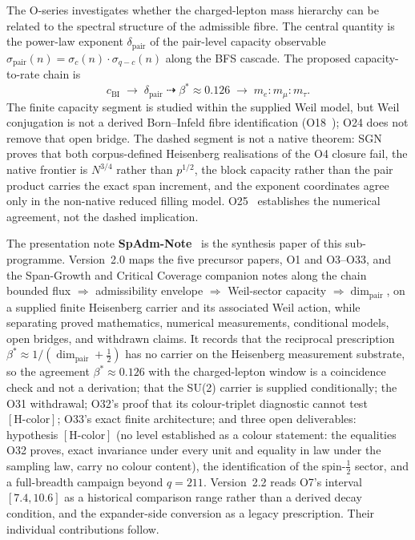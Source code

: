 \documentclass[11pt,a4paper]{article}
\begin{document}
  The O-series investigates whether the charged-lepton mass hierarchy can be related to the
  spectral structure of the admissible fibre.
  The central quantity is the power-law exponent $\delta_{\mathrm{pair}}$ of the pair-level
  capacity observable $\sigma_{\mathrm{pair}}(n) = \sigma_c(n)\cdot\sigma_{q-c}(n)$ along
  the BFS cascade.
  The proposed capacity-to-rate chain is
  \begin{equation}
    c_{\mathrm{BI}} \;\longrightarrow\; \delta_{\mathrm{pair}} \;\dashrightarrow\; \beta^* \approx 0.126
    \;\longrightarrow\; m_e : m_\mu : m_\tau .
    \label{eq:chain}
  \end{equation}
  The finite capacity segment is studied within the supplied Weil model, but Weil conjugation is
  not a derived Born--Infeld fibre identification (O18~\cite{Beau2026a22}); O24 does not remove
  that open bridge.
  The dashed segment is not a native theorem: SGN~\cite{Beau2026sgn} proves that both corpus-defined
  Heisenberg realisations of the O4 closure fail, the native frontier is $N^{3/4}$ rather than
  $p^{1/2}$, the block capacity rather than the pair product carries the exact span increment, and
  the exponent coordinates agree only in the non-native reduced filling model.
  O25~\cite{Beau2026a29} establishes the numerical agreement, not the dashed implication.

  The presentation note \textbf{SpAdm-Note}~\cite{Beau2026a1note} is the synthesis paper of this
  sub-programme. Version~2.0 maps the five precursor papers, O1 and O3--O33, and the Span-Growth and
  Critical Coverage companion notes along the chain bounded flux $\Rightarrow$ admissibility envelope
  $\Rightarrow$ Weil-sector capacity $\Rightarrow \dim_{\mathrm{pair}}$, on a supplied finite Heisenberg
  carrier and its associated Weil action, while separating proved mathematics, numerical measurements,
  conditional models, open bridges, and withdrawn claims.
  It records that the reciprocal prescription $\beta^* \approx 1/(\dim_{\mathrm{pair}} + \tfrac12)$ has
  no carrier on the Heisenberg measurement substrate, so the agreement $\beta^* \approx 0.126$ with the
  charged-lepton window is a coincidence check and not a derivation; that the SU(2) carrier is supplied
  conditionally; the O31 withdrawal; O32's proof that its colour-triplet diagnostic cannot test
  $[\mathrm{H\text{-}color}]$; O33's exact finite architecture; and three open deliverables: hypothesis
  $[\mathrm{H\text{-}color}]$ (no level established as a colour statement: the equalities O32 proves, exact
  invariance under every unit and equality in law under the sampling law, carry no colour content), the
  identification of the spin-$\tfrac12$ sector, and
  a full-breadth campaign beyond $q = 211$.
  Version~2.2 reads O7's interval $[7.4,10.6]$ as a historical comparison range rather than a derived decay
  condition, and the expander-side conversion as a legacy prescription.
  Their individual contributions follow.
\end{document}
